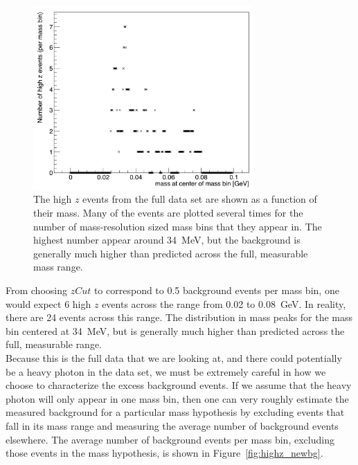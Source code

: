 \begin{figure}[htb]
  \centering
      \includegraphics[width=0.75\textwidth]{pics/results/highz_v_mass.png}
  \caption[High $z$ events as a function of mass]{The high $z$ events from the full data set are shown as a function of their mass. Many of the events are plotted several times for the number of mass-resolution sized mass bins that they appear in. The highest number appear around 34~MeV, but the background is generally much higher than predicted across the full, measurable mass range.}
  \label{fig:highz_mass}
\end{figure} 

From choosing $zCut$ to correspond to 0.5 background events per mass bin, one would expect 6 high $z$ events across the range from 0.02 to 0.08~GeV. In reality, there are 24 events across this range. The distribution in mass peaks for the mass bin centered at 34~MeV, but is generally much higher than predicted across the full, measurable range. \\
\indent Because this is the full data that we are looking at, and there could potentially be a heavy photon in the data set, we must be extremely careful in how we choose to characterize the excess background events. If we assume that the heavy photon will only appear in one mass bin, then one can very roughly estimate the measured background for a particular mass hypothesis by excluding events that fall in its mass range and measuring the average number of background events elsewhere. The average number of background events per mass bin, excluding those events in the mass hypothesis, is shown in Figure~\ref{fig:highz_newbg}.
 
